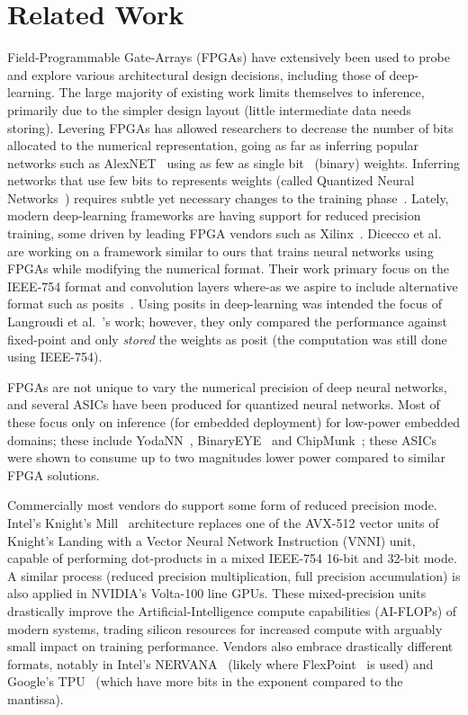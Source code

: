 \documentclass[techrep,english]{ipsj} %
\begin{document}
{\section{Related Work}\label{sec:relwork}
Field-Programmable Gate-Arrays (FPGAs) have extensively been used to probe and explore various architectural design decisions, including those of deep-learning.
The large majority of existing work limits themselves to inference, primarily due to the simpler design layout (little intermediate data needs storing).
Levering FPGAs has allowed researchers to decrease the number of bits allocated to the numerical representation, going as far as inferring popular networks such as  AlexNET~\cite{krizhevsky2012imagenet} using as few as single bit~\cite{shimoda2017all,umuroglu2017finn} (binary) weights.
Inferring networks that use few bits to represents weights (called Quantized Neural Networks~\cite{courbariaux2016binarized}) requires subtle yet necessary changes to the training phase~\cite{binaryconnect,courbariaux2016binarized,zhou2016dorefa}.
Lately, modern deep-learning frameworks are having support for reduced precision training, some driven by leading FPGA vendors such as Xilinx~\cite{xilinxml}.
Dicecco et al.~\cite{dicecco2017fpga} are working on a framework similar to ours that trains neural networks using FPGAs while modifying the numerical format.
Their work primary focus on the IEEE-754 format and convolution layers where-as we aspire to include alternative format such as posits~\cite{posits}.
Using posits in deep-learning was intended the focus of Langroudi et al.~\cite{langroudi2018deep}’s work; however, they only compared the performance against fixed-point and only \textit{stored} the weights as posit (the computation was still done using IEEE-754).

FPGAs are not unique to vary the numerical precision of deep neural networks, and several ASICs have been produced for quantized neural networks.
Most of these focus only on inference (for embedded deployment)  for low-power embedded domains; these include YodaNN~\cite{yodann}, BinaryEYE~\cite{binaryeye} and ChipMunk~\cite{chipmunk}; these ASICs were shown to consume up to two magnitudes lower power compared to similar FPGA solutions.

Commercially most vendors do support some form of reduced precision mode.
Intel’s Knight’s Mill~\cite{knm} architecture replaces one of the AVX-512 vector units of Knight’s Landing with a Vector Neural Network Instruction (VNNI) unit, capable of performing dot-products in a mixed IEEE-754 16-bit and 32-bit mode.
A similar process (reduced precision multiplication, full precision accumulation) is also applied in NVIDIA’s Volta-100 line GPUs.
These mixed-precision units drastically improve the Artificial-Intelligence compute capabilities (AI-FLOPs) of modern systems, trading silicon resources for increased compute with arguably small impact on training performance.
Vendors also embrace drastically different formats, notably in Intel’s NERVANA~\cite{nervana} (likely where FlexPoint~\cite{intelflexpoint} is used) and Google’s TPU~\cite{tpuformat} (which have more bits in the exponent compared to the mantissa).


}
\end{document}
